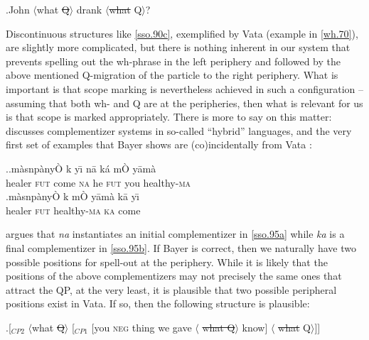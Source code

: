 \documentclass[charis]{glossa}
\begin{document}
\ex.\label{sso.94}John $\langle$what \sout{Q}$\rangle$ drank $\langle$\sout{what } Q$\rangle$?

Discontinuous structures like \ref{sso.90c}, exemplified by Vata (example in \ref{wh.70}), are slightly more complicated, but there is nothing inherent in our system that prevents spelling out the wh-phrase in the left periphery and followed by the above mentioned Q-migration of the particle to the right periphery. What is important is that scope marking is nevertheless achieved in such a configuration -- assuming that both wh- and Q are at the peripheries, then what is relevant for us is that scope is marked appropriately. There is more to say on this matter: \cite{Bayer:1999} discusses complementizer systems in so-called ``hybrid'' languages, and the very first set of examples that Bayer shows are (co)incidentally from Vata \citep{koopman:1984}:

\ex.\ag.\label{sso.95a}m\`asn{}p\`any\`O k{} y\={\i} n\=a {} k\'a m\`O y\=am\`a\\
   healer \textsc{fut} come \textsc{na} he \textsc{fut} you healthy-\textsc{ma} \\
    \bg.\label{sso.95b}m\`asn{}p\`any\`O k{} m\`O y\=am\`a k\=a y\={\i} \\
   healer \textsc{fut} healthy-\textsc{ma} \textsc{ka} come \\

\cite{Bayer:1999} argues that \textit{na} instantiates an initial complementizer in \ref{sso.95a} while \textit{ka} is a final complementizer in \ref{sso.95b}. If Bayer is correct, then we naturally have two possible positions for spell-out at the periphery. While it is likely that the positions of the above complementizers may not precisely the same ones that attract the QP, at the very least, it is plausible that two possible peripheral positions exist in Vata. If so, then the following structure is plausible:

\ex.\label{sso.96}[$_{CP2}$ $\langle$what \sout{Q}$\rangle$ [$_{CP1}$ [you \textsc{neg} thing we gave $\langle$ \sout{what Q}$\rangle$ know] $\langle$ \sout{what} Q$\rangle$]]
\end{document}
